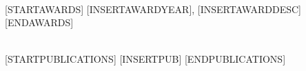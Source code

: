 \SectionSpacing
{}\\
[STARTAWARDS]
[INSERTAWARDYEAR], [INSERTAWARDDESC]
[ENDAWARDS]

\SectionSpacing
{}\\
[STARTPUBLICATIONS]
{\PublicationBullet}[INSERTPUB]
[ENDPUBLICATIONS]
